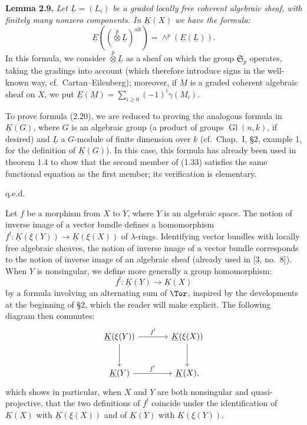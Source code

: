 %
\textbf{Lemma 2.9.} \emph{Let $\underline L=(L_i)$ be a graded locally free coherent algebraic sheaf, with finitely many nonzero components. In $\underline K(X)$ we have the formula:}
\begin{equation}\tag{2.20}
 \underline E\left((\overset{p}{\otimes}\underline L)^{\mathrm{alt}}\right)=\wedge^p(\underline E(\underline L)).
\end{equation}
In this formula, we consider $\overset{p}{\otimes}\underline L$ as a sheaf on which the group $\mathfrak S_p$ operates, taking the gradings into account (which therefore introduce signs in the well-known way, cf.\ Cartan--Eilenberg); moreover, if $\underline M$ is a graded coherent algebraic sheaf on $X$, we put $\underline E(\underline M)=\sum_{i\geq0}(-1)^i\gamma(M_i)$.

To prove formula (2.20), we are reduced to proving the analogous formula in $\underline K(G)$, where $G$ is an algebraic group (a product of groups $\operatorname{Gl}(n,k)$, if desired) and $\underline L$ a $G$-module of finite dimension over $k$ (cf.\ Chap.\ I, \S 2, example 1, for the definition of $\underline K(G)$). In this case, this formula has already been used in theorem 1.4 to show that the second member of (1.33) satisfies the same functional equation as the first member; its verification is elementary.
\begin{flushright}q.e.d.\end{flushright}

Let $f$ be a morphism from $X$ to $Y$, where $Y$ is an algebraic space. The notion of inverse image of a vector bundle defines a homomorphism $f^!:\underline K(\xi(Y))\longrightarrow\underline K(\xi(X))$ of $\lambda$-rings. Identifying vector bundles with locally free algebraic sheaves, the notion of inverse image of a vector bundle corresponds to the notion of inverse image of an algebraic sheaf (already used in [3, no.\ 8]). When $Y$ is nonsingular, we define more generally a group homomorphism:
\begin{equation}\tag{2.21}
 f^!:\underline K(Y)\longrightarrow\underline K(X)
\end{equation}
%
by a
formula involving an alternating sum of $\Tor$, inspired by the developments at the beginning of \S 2, which the reader will make explicit. The following diagram then commutes:
\[
\begin{tikzcd}[column sep=large,row sep=large]
\underline K(\xi(Y)) \arrow[r,"f^!"] \arrow[d] & \underline K(\xi(X)) \arrow[d]\\
\underline K(Y) \arrow[r,"f^!"] & \underline K(X){,}
\end{tikzcd}
\]
which shows in particular, when $X$ and $Y$ are both nonsingular and quasi-projective, that the two definitions of $f^!$ coincide under the identification of $\underline K(X)$ with $\underline K(\xi(X))$ and of $\underline K(Y)$ with $\underline K(\xi(Y))$.

